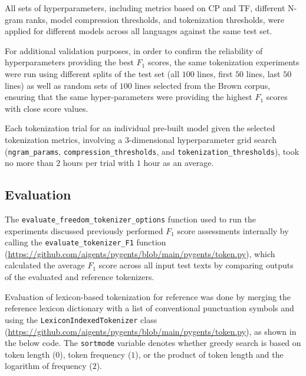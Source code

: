 \documentclass[11pt]{article}
\begin{document}
All sets of hyperparameters, including metrics based on CP and TF, different N-gram ranks, model compression thresholds, and tokenization thresholds, were applied for different models across all languages against the same test set. 

For additional validation purposes, in order to confirm the reliability of hyperparameters providing the best $F_1$ scores, the same tokenization experiments were run using different splits of the test set (all $100$ lines, first $50$ lines, last $50$ lines) as well as random sets of $100$ lines selected from the Brown corpus, ensuring that the same hyper-parameters were providing the highest $F_1$ scores with close score values. 

Each tokenization trial for an individual pre-built model given the selected tokenization metrics, involving a $3$-dimensional hyperparameter grid search (\texttt{ngram\_params}, \texttt{compression\_thresholds}, and \texttt{tokenization\_thresholds}), took no more than $2$ hours per trial with $1$ hour as an average.

\subsection{Evaluation}

The \texttt{evaluate\_freedom\_tokenizer\_options} function used to run the experiments discussed previously performed $F_1$ score assessments internally by calling the  \texttt{evaluate\_tokenizer\_F1} function (\url{https://github.com/aigents/pygents/blob/main/pygents/token.py}), which calculated the average $F_1$ score across all input test texts by comparing outputs of the evaluated and reference tokenizers.  

Evaluation of lexicon-based tokenization for reference was done by merging the reference lexicon dictionary with a list of conventional punctuation symbols and using the \texttt{LexiconIndexedTokenizer} class (\url{https://github.com/aigents/pygents/blob/main/pygents/token.py}), as shown in the below code. The \texttt{sortmode} variable denotes whether greedy search is based on token length ($0$), token frequency ($1$), or the product of token length and the logarithm of frequency ($2$).
\end{document}
